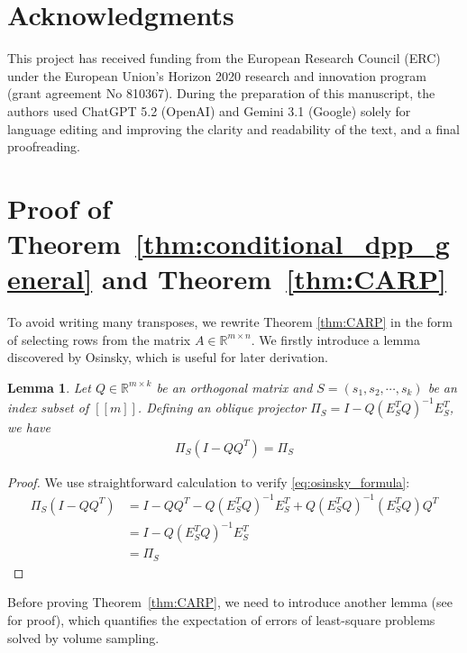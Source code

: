 \documentclass[11pt]{article}
\newtheorem{lemma}{Lemma}[section]
\newcommand{\be}{\begin{eqnarray}}
\newcommand{\ee}{\end{eqnarray}}
\newcommand{\R}{\mathbb{R}}
\newcommand{\<}{\langle}
\renewcommand{\>}{\rangle}
\begin{document}
 

 




 


 


\section*{Acknowledgments}
This project has received funding from the European Research
Council (ERC) under the European Union's Horizon 2020 research and innovation program (grant agreement No 810367). During the preparation of this manuscript, the authors used ChatGPT 5.2 (OpenAI) and Gemini 3.1 (Google) solely for language editing and improving the clarity and readability of the text, and a final proofreading.
\appendix

\section{Proof of Theorem~\ref{thm:conditional_dpp_general} and Theorem~\ref{thm:CARP}}
To avoid writing many transposes, we rewrite Theorem \ref{thm:CARP} in the form of selecting rows from the matrix $A\in \mathbb{R}^{m \times n}$. We firstly introduce a lemma\cite{OSINSKY2025359} discovered by Osinsky, which is useful for later derivation.

\begin{lemma}
\label{lma:osinsky}
Let $Q\in \R^{m\times k}$ be an orthogonal matrix and $S = (s_1,s_2,\cdots,s_k)$ be an index subset of $[\![m]\!]$. Defining an oblique projector $\Pi_S = I - Q(E_S^TQ)^{-1}E_S^T$, we have
\be \label{eq:osinsky_formula}
\Pi_S (I - QQ^T) = \Pi_S
\ee
\end{lemma}
\begin{proof}
We use straightforward calculation to verify \eqref{eq:osinsky_formula}:
\[
\begin{aligned}
        \Pi_S (I - QQ^T) &=I - QQ^T - Q(E_S^TQ)^{-1}E_S^T + Q(E_S^TQ)^{-1}(E_S^TQ)Q^T\\ 
        &= I - Q(E_S^TQ)^{-1}E_S^T\\
        &= \Pi_S
    \end{aligned}
\]
\end{proof}

Before proving Theorem~\ref{thm:CARP}, we need to introduce another lemma (see \cite{lsq_volumesampling} for proof), which quantifies the expectation of errors of least-square problems solved by volume sampling. 
\end{document}
